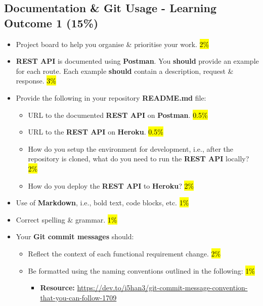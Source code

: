 \documentclass{article}
\begin{document}
\subsection*{Documentation \& Git Usage - Learning Outcome 1 (15\%)}
\begin{itemize}
  \item Project board to help you organise \& prioritise your work. \hl{2\%}
  \item \textbf{REST API} is documented using \textbf{Postman}. You \textbf{should} provide an example for each route. Each example \textbf{should} contain a description, request \& response. \hl{3\%}
  \item Provide the following in your repository \textbf{README.md} file:
        \begin{itemize}
          \item URL to the documented \textbf{REST API} on \textbf{Postman}. \hl{0.5\%}
          \item URL to the \textbf{REST API} on \textbf{Heroku}. \hl{0.5\%}
          \item How do you setup the environment for development, i.e., after the repository is cloned, what do you need to run the \textbf{REST API} locally? \hl{2\%}
          \item How do you deploy the \textbf{REST API} to \textbf{Heroku}? \hl{2\%}
        \end{itemize}
  \item Use of \textbf{Markdown}, i.e., bold text, code blocks, etc. \hl{1\%}
  \item Correct spelling \& grammar. \hl{1\%}
  \item Your \textbf{Git commit messages} should:
        \begin{itemize}
          \item Reflect the context of each functional requirement change. \hl{2\%}
          \item Be formatted using the naming conventions outlined in the following: \hl{1\%}
                \begin{itemize}
                  \item \textbf{Resource:} \small\href{https://dev.to/i5han3/git-commit-message-convention-that-you-can-follow-1709}{https://dev.to/i5han3/git-commit-message-convention-that-you-can-follow-1709}
                \end{itemize}
        \end{itemize}
\end{itemize}
\end{document}
